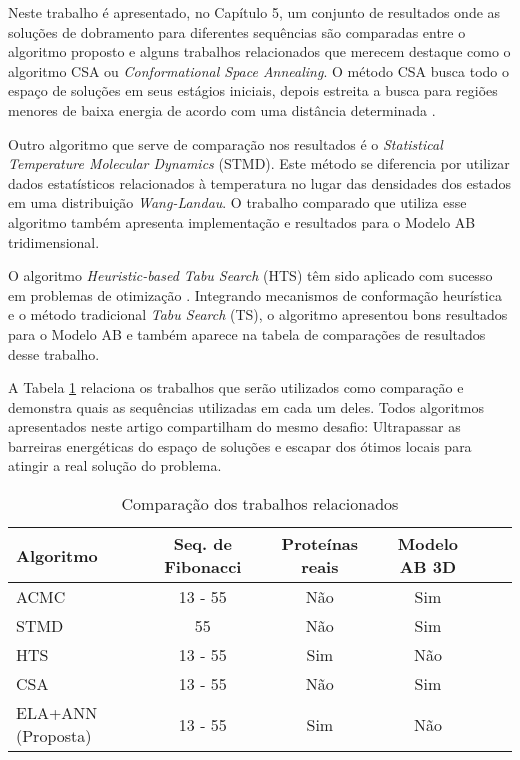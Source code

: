 \documentclass[dm,ppgcomp]{texfurg}
\begin{document}
Neste trabalho é apresentado, no Capítulo 5, um conjunto de resultados onde as soluções de dobramento para diferentes sequências são comparadas entre o algoritmo proposto e alguns trabalhos relacionados que merecem destaque como o algoritmo CSA ou {\it Conformational Space Annealing}. O método CSA busca todo o espaço de soluções em seus estágios iniciais, depois estreita a busca para regiões menores de baixa energia de acordo com uma distância determinada \cite{lee2008re}. 

Outro algoritmo que serve de comparação nos resultados é o {\it Statistical Temperature Molecular Dynamics} (STMD). Este método se diferencia por utilizar dados estatísticos relacionados à temperatura no lugar das densidades dos estados em uma distribuição {\it Wang-Landau}. O trabalho comparado \cite{kim2006statistical} que utiliza esse algoritmo também apresenta implementação e resultados para o Modelo AB tridimensional.

O algoritmo {\it Heuristic-based Tabu Search} (HTS) têm sido aplicado com sucesso em problemas de otimização \cite{liu2013heuristic}. Integrando mecanismos de conformação heurística e o método tradicional {\it Tabu Search} (TS), o algoritmo apresentou bons resultados para o Modelo AB e também aparece na tabela de comparações de resultados desse trabalho.

A Tabela \ref{tabelarela} relaciona os trabalhos que serão utilizados como comparação e demonstra quais as sequências utilizadas em cada um deles. Todos algoritmos apresentados neste artigo compartilham do mesmo desafio: Ultrapassar as barreiras energéticas do espaço de soluções e escapar dos ótimos locais para atingir a real solução do problema. 

\begin{table}
\begin{center}
\caption{Comparação dos trabalhos relacionados}\label{tabelarela}
\begin{tabular}{lccccr}
\hline
Algoritmo & Seq. de Fibonacci & Proteínas reais & Modelo AB 3D\\
\hline
ACMC \cite{liang2004annealing} & 13 - 55 & Não & Sim\\
STMD \cite{kim2006statistical} & 55 & Não & Sim\\
HTS \cite{liu2013heuristic} & 13 - 55 & Sim & Não\\
CSA \cite{lee2008re} & 13 - 55 & Não & Sim\\
ELA+ANN (Proposta) & 13 - 55 & Sim & Não\\
\hline
\end{tabular}
\end{center}
\end{table}
\end{document}
